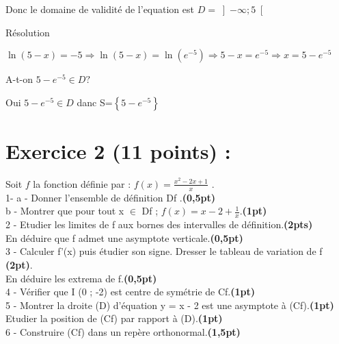 \documentclass[12pt]{article}
\begin{document}

Donc le domaine de validité de l'equation est $D=\left]-\infty; 5\right[ $

Résolution

$\ln(5-x)=-5\Rightarrow \ln(5-x)=\ln(e^{-5}) \Rightarrow 5-x=e^{-5}\Rightarrow x=5-e^{-5}$

A-t-on $5-e^{-5} \in D ?$

Oui $5-e^{-5} \in D$ danc S=$\left\lbrace 5-e^{-5} \right\rbrace $
\section*{Exercice 2 (11 points) :}
Soit  $f$  la fonction définie par : $f(x) =\frac{x^{2}-2x+1}{x}$ .\\
    1- a - Donner  l’ensemble de définition  Df .\textbf{(0,5pt)}\\
b - Montrer que pour tout x $\in$ Df ; $f(x) =x-2+\frac{1}{x} $.\textbf{(1pt)}\\
       2  - Etudier les limites de f aux bornes des intervalles de définition.\textbf{(2pts)}\\ 
              En déduire que f admet une asymptote verticale.\textbf{(0,5pt)}\\
       3 - Calculer  f'(x) puis étudier son signe. Dresser le tableau de variation de f \textbf{(2pt)}.\\
             En déduire les extrema  de f.\textbf{(0,5pt)}\\
        4 - Vérifier que  I (0 ; -2) est centre de symétrie de Cf.\textbf{(1pt)} \\
        5 -  Montrer la droite (D) d’équation  y = x - 2  est une asymptote à (Cf).\textbf{(1pt)} \\
             Etudier la position de (Cf) par rapport à (D).\textbf{(1pt)}\\
         6 - Construire (Cf) dans un repère orthonormal.\textbf{(1,5pt)}\\
\end{document}

